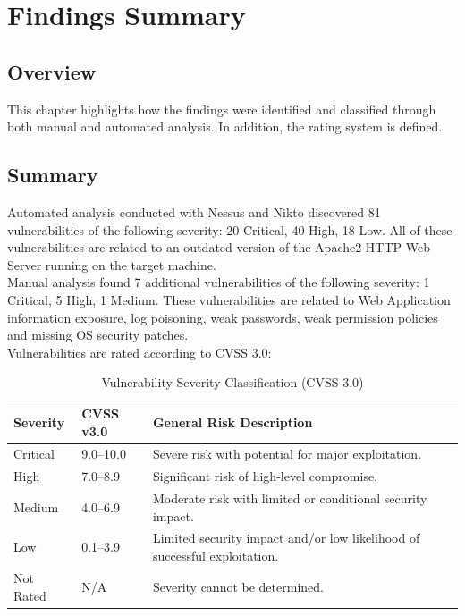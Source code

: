 
\chapter{Findings Summary}

\section {Overview}
This chapter highlights how the findings were identified and classified through both manual and automated analysis. In addition, the rating system is defined.

\section {Summary}
Automated analysis conducted with Nessus and Nikto discovered 81 vulnerabilities of the following severity: 20 Critical, 40 High, 18 Low. All of these vulnerabilities are related to an outdated version of the Apache2 HTTP Web Server running on the target machine.
\\

Manual analysis found 7 additional vulnerabilities of the following severity: 1 Critical, 5 High, 1 Medium. These vulnerabilities are related to Web Application information exposure, log poisoning, weak passwords, weak permission policies and missing OS security patches.
\\

Vulnerabilities are rated according to CVSS 3.0:

\begin{table}[htbp]
	\centering
	\caption{Vulnerability Severity Classification (CVSS 3.0)}
	\label{tab:vulnerability-severity}
	\begin{tabular}{@{}llp{10cm}@{}}
		\toprule
		\textbf{Severity} &
		\textbf{CVSS v3.0} &
		\textbf{General Risk Description}\\
		\midrule
		
		Critical &
		9.0--10.0 &
		Severe risk with potential for major exploitation.\\
		
		High &
		7.0--8.9 &
		Significant risk of high-level compromise.\\
		
		Medium &
		4.0--6.9 &
		Moderate risk with limited or conditional security impact. \\
		
		Low &
		0.1--3.9 &
		Limited security impact and/or low likelihood of successful
		exploitation. \\
		
		Not Rated &
		N/A &
		Severity cannot be determined. \\
		
		\bottomrule
	\end{tabular}
\end{table}

